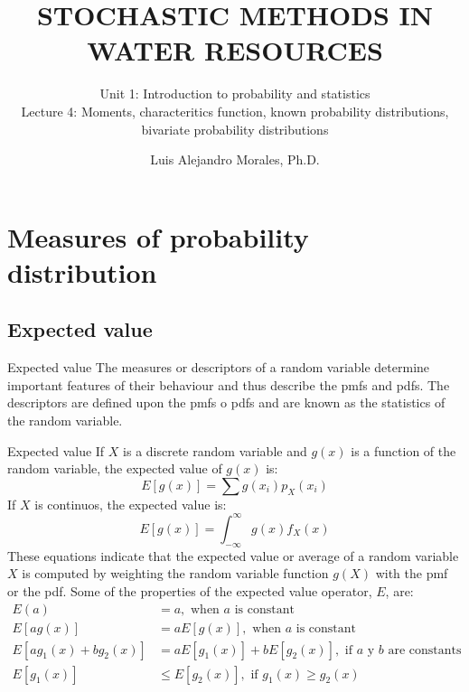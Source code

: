 \documentclass[8pt]{beamer}
\title{STOCHASTIC METHODS IN WATER RESOURCES}
\subtitle{Unit 1: Introduction to probability and statistics \\ Lecture 4: Moments, characteritics function, known probability distributions, bivariate probability distributions}
\author{Luis Alejandro Morales, Ph.D.}
\institute{Universidad Nacional de Colombia \\ Department of Civil and Agriculture Engineering} %
\renewcommand{\emph}[1]{\textcolor{myorange}{#1}}
\begin{document}
\begin{frame}
    \titlepage
\end{frame}

\section{Measures of probability distribution}
\subsection{Expected value}
\begin{frame}{Expected value}
    The measures or descriptors of a random variable determine important features of their behaviour and thus describe the \emph{pmfs} and \emph{pdfs}. The descriptors are defined upon the \emph{pmfs} o \emph{pdfs} and are known as the \emph{statistics} of the random variable. 
    \begin{block}{Expected value}
        If $X$ is a discrete random variable and $g(x)$ is a function of the random variable, the \alert{expected value} of $g(x)$ is:
        \[
            E\left[g(x)\right] = \sum g(x_i) p_X(x_i)
        \]
        If $X$ is continuos, the \alert{expected value} is:
        \[
            E\left[g(x)\right] = \int_{-\infty}^{\infty} g(x) f_X(x)
        \]
        These equations indicate that the expected value or average of a random variable $X$ is computed by weighting the random variable function $g(X)$ with the \emph{pmf} or the \emph{pdf}. Some of the properties of the expected value operator, $E$, are:
        \begin{align*}
            E(a) &= a, \text{ when $a$ is constant} \\
            E\left[a g(x) \right] &= a E\left[g(x) \right], \text{ when $a$ is constant} \\
            E\left[a g_1 (x) + b g_2 (x) \right] &= a E\left[g_1 (x) \right] + b E\left[g_2 (x) \right], \text{ if $a$ y $b$ are constants} \\
            E\left[g_1 (x) \right] &\leq E\left[g_2 (x) \right],  \text{ if $g_1(x) \geq g_2(x)$}
        \end{align*}
    \end{block}
\end{frame}
\end{document}

